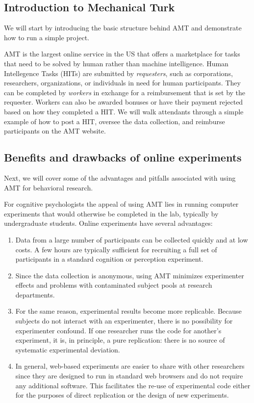 \documentclass[10pt,letterpaper]{article}
\begin{document}
\subsection{Introduction to Mechanical Turk}
We will start by introducing the basic structure behind AMT and demonstrate how
to run a simple project.

AMT is the largest online service in the US that offers a marketplace for tasks
that need to be solved by human rather than machine intelligence. Human
Intellegence Tasks (HITs) are submitted by \emph{requesters}, such as
corporations, researchers, organizations, or individuals in need for human
participants.  They can be completed by \emph{workers} in exchange for a
reimbursement that is set by the requester. Workers can also be awarded bonuses
or have their payment rejected based on how they completed a {HIT}. We will walk
attendants through a simple example of how to post a HIT, oversee the data
collection, and reimburse participants on the AMT website.


\subsection{Benefits and drawbacks of online experiments}
Next, we will cover some of the advantages and pitfalls associated with using AMT
for behavioral research.

For cognitive psychologists the appeal of using AMT lies in running computer
experiments that would otherwise be completed in the lab, typically by
undergraduate students. Online experiments have several advantages:
\begin{enumerate}
\item
    Data from a large number of participants can be collected  quickly and at low
    costs.  A few hours are typically sufficient for recruiting a full set of participants in a standard cognition or
    perception experiment.
\item
    Since the data collection is anonymous, using AMT minimizes experimenter
    effects and problems with contaminated subject pools at research departments.
\item 
    For the same reason, experimental results become more replicable. Because
    subjects do not interact with an experimenter, there is no possibility for
    experimenter confound. If one researcher runs the code for another's
    experiment, it is, in principle, a pure replication: there is no source of
    systematic experimental deviation.
\item 
	In general, web-based experiments are easier to share with other researchers since they are designed to run in standard web browsers and do not require any additional software. This facilitates the re-use of experimental code either for the purposes of direct replication or the design of new experiments.
\end{enumerate}
\end{document}
